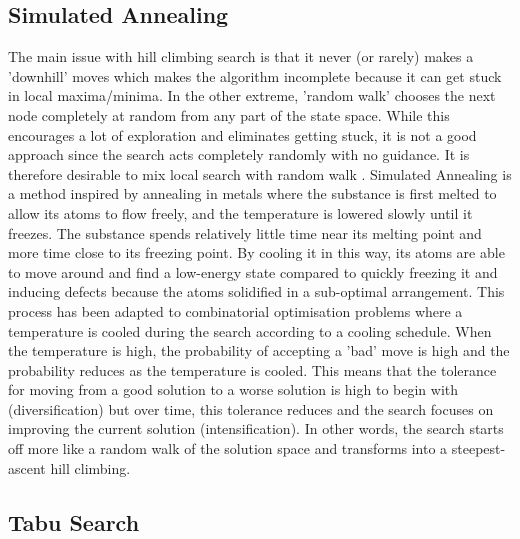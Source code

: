 \subsection{Simulated Annealing}

The main issue with hill climbing search is that it never (or rarely) makes a 'downhill' moves which makes the algorithm incomplete because it can get stuck in local maxima/minima. In the other extreme, 'random walk' chooses the next node completely at random from any part of the state space. While this encourages a lot of exploration and eliminates getting stuck, it is not a good approach since the search acts completely randomly with no guidance. It is therefore desirable to mix local search with random walk \citep{russell2016artificial}. Simulated Annealing \citep{kirkpatrick1983optimization} is a method inspired by annealing in metals where the substance is first melted to allow its atoms to flow freely, and the temperature is lowered slowly until it freezes. The substance spends relatively little time near its melting point and more time close to its freezing point. By cooling it in this way, its atoms are able to move around and find a low-energy state compared to quickly freezing it and inducing defects because the atoms solidified in a sub-optimal arrangement. This process has been adapted to combinatorial optimisation problems where a temperature is cooled during the search according to a cooling schedule. When the temperature is high, the probability of accepting a 'bad' move is high and the probability reduces as the temperature is cooled. This means that the tolerance for moving from a good solution to a worse solution is high to begin with (diversification) but over time, this tolerance reduces and the search focuses on improving the current solution (intensification). In other words, the search starts off more like a random walk of the solution space and transforms into a steepest-ascent hill climbing.

\subsection{Tabu Search}

